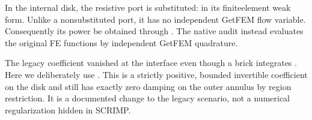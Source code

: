 \documentclass[letterpaper,10pt,english]{sphinxmanual}
\begin{document}
\begin{sphinxVerbatim}[commandchars=\\\{\}]
      \PYG{p}{[}
        \PYG{p}{[}\PYG{p}{]}  
        \PYG{p}{[}\PYG{p}{]}  
        \PYG{p}{[}\PYG{p}{]}  
        \PYG{p}{[}\PYG{p}{]}  
    \PYG{p}{]}
    
       
    
\end{sphinxVerbatim}

\sphinxAtStartPar
In the internal disk, the resistive port is substituted:
 in its finite\sphinxhyphen{}element weak form.
Unlike a non\sphinxhyphen{}substituted port, it has no independent
GetFEM flow variable. Consequently its power 
be obtained through . The native audit
instead evaluates the original FE functions by independent
GetFEM quadrature.

\sphinxAtStartPar
The legacy coefficient  vanished at
the interface even though a brick integrates .
Here we deliberately use
 .
This is a strictly positive, bounded invertible
coefficient on the disk and still has exactly zero
damping on the outer annulus by region restriction.
It is a documented change to the legacy scenario,
not a numerical regularization hidden in SCRIMP.
\end{document}
